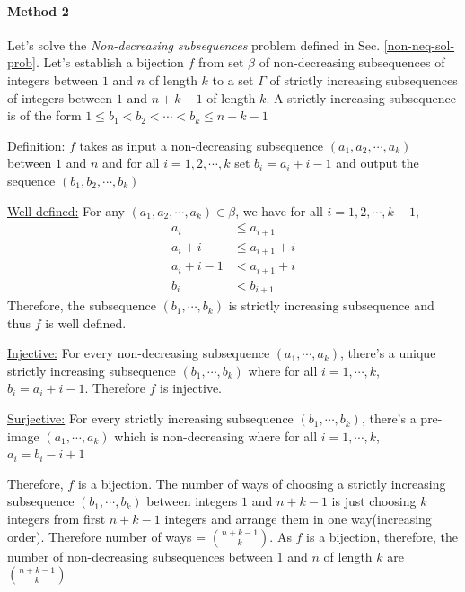 \paragraph{Method 2} Let's solve the \emph{Non-decreasing subsequences} problem defined in Sec. \ref{non-neq-sol-prob}. Let's establish a bijection $f$ from set $\beta$ of non-decreasing subsequences of integers between $1$ and $n$ of length $k$ to a set $\Gamma$ of strictly increasing subsequences of integers between $1$ and $n+k-1$ of length $k$. A strictly increasing subsequence is of the form $1\leq b_1<b_2<\cdots<b_k\leq n+k-1$
\begin{description}
\item{\underline{Definition:}} $f$ takes as input a non-decreasing subsequence $(a_1,a_2,\cdots,a_k)$ between $1$ and $n$ and for all $i=1,2,\cdots,k$ set $b_i = a_i+i-1$ and output the sequence $(b_1,b_2,\cdots,b_k)$
\item{\underline{Well defined:}} For any $(a_1,a_2,\cdots,a_k)\in\beta$, we have for all $i=1,2,\cdots,k-1$, \begin{align*}
    a_i &\leq a_{i+1}\\
    a_i+i &\leq a_{i+1}+i\\
    a_i+i-1 &< a_{i+1}+i\\
    b_i &< b_{i+1}
\end{align*}  Therefore, the subsequence $(b_1,\cdots,b_k)$ is strictly increasing subsequence and thus $f$ is well defined.
\item{\underline{Injective:}} For every non-decreasing subsequence $(a_1,\cdots,a_k)$, there's a unique strictly increasing subsequence $(b_1,\cdots,b_k)$ where for all $i=1,\cdots,k$, $b_i = a_i+i-1$. Therefore $f$ is injective.
\item{\underline{Surjective:}} For every strictly increasing subsequence $(b_1,\cdots,b_k)$, there's a pre-image $(a_1,\cdots,a_k)$ which is non-decreasing where for all $i=1,\cdots,k$, $a_i=b_i-i+1$
\end{description}


Therefore, $f$ is a bijection. The number of ways of choosing a strictly increasing subsequence $(b_1,\cdots,b_k)$ between integers $1$ and $n+k-1$ is just choosing $k$ integers from first $n+k-1$ integers and arrange them in one way(increasing order). Therefore number of ways = $\binom{n+k-1}{k}$. As $f$ is a bijection, therefore, the number of non-decreasing subsequences between $1$ and $n$ of length $k$ are $\binom{n+k-1}{k}$

